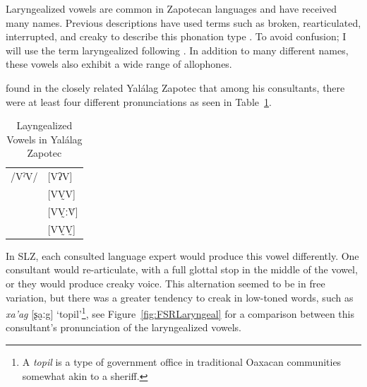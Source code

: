 \documentclass[12pt, letterpaper]{article}
\providecommand{\lsptoprule}{\midrule\toprule}
\providecommand{\lspbottomrule}{\bottomrule\midrule}
\begin{document}
Laryngealized vowels are common in Zapotecan languages and have received many names. Previous descriptions have used terms such as broken, rearticulated, interrupted, and creaky to describe this phonation type \citep{longDiccionarioZapotecoSan2005,avelinobecerraTopicsYalalagZapotec2004,avelinoAcousticElectroglottographicAnalyses2010,sonnenscheinDescriptiveGrammarSan2005,adlerAcousticsPhonationTypes2016}. To avoid confusion; I will use the term laryngealized following \citet{avelinoAcousticElectroglottographicAnalyses2010}. In addition to many different names, these vowels also exhibit a wide range of allophones. 

\citet{avelinoAcousticElectroglottographicAnalyses2010} found in the closely related Yalálag Zapotec that among his consultants, there were at least four different pronunciations as seen in Table~\ref{tab:laryngeal}. 
\begin{table}[!h]
	\centering
	\caption{Layngealized Vowels in Yalálag Zapotec}
	\label{tab:laryngeal}
	 \begin{tabular}{ll}
	\lsptoprule
	/VˀV/	&  [VʔV]  \\
			&  [VV̰V]   \\
			&  [VV̰ːV̆]  \\
			&  [VV̰V̰]	\\
	\lspbottomrule
	\end{tabular}
\end{table}
In SLZ, each consulted language expert would produce this vowel differently. One consultant would re-articulate, with a full glottal stop in the middle of the vowel, or they would produce creaky voice. This alternation seemed to be in free variation, but there was a greater tendency to creak in low-toned words, such as \textit{xa'ag} [ʂa̰ːg] `topil'\footnote{A \textit{topil} is a type of government office in traditional Oaxacan communities somewhat akin to a sheriff.}, see Figure~\ref{fig:FSRLaryngeal} for a comparison between this consultant's pronunciation of the laryngealized vowels.
\end{document}
